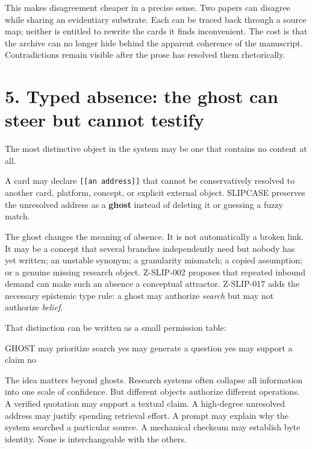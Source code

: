 \documentclass[
  11pt,
]{article}
\newenvironment{Shaded}{}{}
\newcommand{\NormalTok}[1]{#1}
\begin{document}
This makes disagreement cheaper in a precise sense. Two papers can
disagree while sharing an evidentiary substrate. Each can be traced back
through a source map; neither is entitled to rewrite the cards it finds
inconvenient. The cost is that the archive can no longer hide behind the
apparent coherence of the manuscript. Contradictions remain visible
after the prose has resolved them rhetorically.

\section{5. Typed absence: the ghost can steer but cannot
testify}\label{typed-absence-the-ghost-can-steer-but-cannot-testify}

The most distinctive object in the system may be one that contains no
content at all.

A card may declare \texttt{{[}{[}an\ address{]}{]}} that cannot be
conservatively resolved to another card, platform, concept, or explicit
external object. SLIPCASE preserves the unresolved address as a
\textbf{ghost} instead of deleting it or guessing a fuzzy match.

The ghost changes the meaning of absence. It is not automatically a
broken link. It may be a concept that several branches independently
need but nobody has yet written; an unstable synonym; a granularity
mismatch; a copied assumption; or a genuine missing research object.
Z-SLIP-002 proposes that repeated inbound demand can make such an
absence a conceptual attractor. Z-SLIP-017 adds the necessary epistemic
type rule: a ghost may authorize \emph{search} but may not authorize
\emph{belief}.

That distinction can be written as a small permission table:

\begin{Shaded}
\begin{Highlighting}[]
\NormalTok{GHOST}
\NormalTok{  may prioritize search       yes}
\NormalTok{  may generate a question     yes}
\NormalTok{  may support a claim         no}
\end{Highlighting}
\end{Shaded}

The idea matters beyond ghosts. Research systems often collapse all
information into one scale of confidence. But different objects
authorize different operations. A verified quotation may support a
textual claim. A high-degree unresolved address may justify spending
retrieval effort. A prompt may explain why the system searched a
particular source. A mechanical checksum may establish byte identity.
None is interchangeable with the others.
\end{document}
